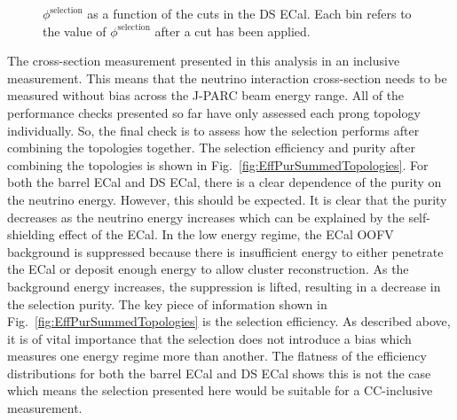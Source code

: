\begin{figure}
\begin{minipage}{.5\linewidth}
\centering
{}
\end{minipage}\par\medskip
\caption{$\phi^{\textrm{selection}}$ as a function of the cuts in the DS ECal.  Each bin refers to the value of $\phi^{\textrm{selection}}$ after a cut has been applied.}
\label{fig:SelFOMCutLevelDS}
\end{figure}
\newline
\newline
The cross-section measurement presented in this analysis in an inclusive measurement.  This means that the neutrino interaction cross-section needs to be measured without bias across the J-PARC beam energy range.  All of the performance checks presented so far have only assessed each prong topology individually.  So, the final check is to assess how the selection performs after combining the topologies together.  The selection efficiency and purity after combining the topologies is shown in Fig.~\ref{fig:EffPurSummedTopologies}.  For both the barrel ECal and DS ECal, there is a clear dependence of the purity on the neutrino energy.  However, this should be expected.  It is clear that the purity decreases as the neutrino energy increases which can be explained by the self-shielding effect of the ECal.  In the low energy regime, the ECal OOFV background is suppressed because there is insufficient energy to either penetrate the ECal or deposit enough energy to allow cluster reconstruction.  As the background energy increases, the suppression is lifted, resulting in a decrease in the selection purity.  The key piece of information shown in Fig.~\ref{fig:EffPurSummedTopologies} is the selection efficiency.  As described above, it is of vital importance that the selection does not introduce a bias which measures one energy regime more than another.  The flatness of the efficiency distributions for both the barrel ECal and DS ECal shows this is not the case which means the selection presented here would be suitable for a CC-inclusive measurement.

